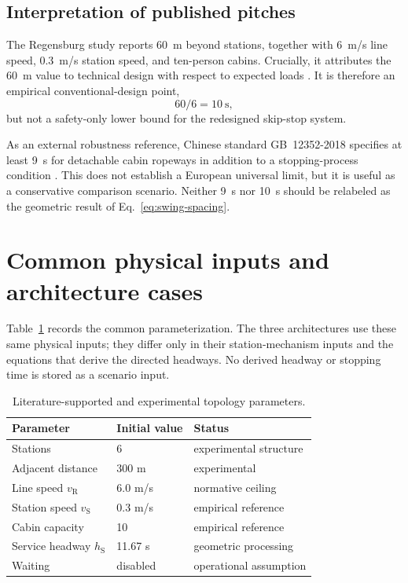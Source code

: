 \documentclass[11pt,a4paper]{scrartcl}
\newcommand{\vlinehaul}{v_{\mathrm R}}
\newcommand{\vstation}{v_{\mathrm S}}
\newcommand{\hservice}{h_{\mathrm S}}
\begin{document}
\subsection{Interpretation of published pitches}

The Regensburg study reports 60~m beyond stations, together with 6~m/s line
speed, 0.3~m/s station speed, and ten-person cabins.  Crucially, it attributes
the 60~m value to technical design with respect to expected loads
\cite{haimerl2022}.  It is therefore an empirical conventional-design point,
\[
60/6=10\ \mathrm s,
\]
but not a safety-only lower bound for the redesigned skip-stop system.

As an external robustness reference, Chinese standard GB~12352-2018 specifies
at least 9~s for detachable cabin ropeways in addition to a stopping-process
condition \cite{gb12352}.  This does not establish a European universal limit,
but it is useful as a conservative comparison scenario.  Neither 9~s nor 10~s
should be relabeled as the geometric result of Eq.~\eqref{eq:swing-spacing}.

\section{Common physical inputs and architecture cases}

Table~\ref{tab:baseline} records the common parameterization.  The three
architectures use these same physical inputs; they differ only in their
station-mechanism inputs and the equations that derive the directed headways.
No derived headway or stopping time is stored as a scenario input.

\begin{table}[ht]
\centering
\caption{Literature-supported and experimental topology parameters.}
\label{tab:baseline}
\begin{tabular}{@{}lll@{}}
\toprule
Parameter & Initial value & Status \\
\midrule
Stations & 6 & experimental structure \\
Adjacent distance & 300 m & experimental \\
Line speed $\vlinehaul$ & 6.0 m/s & normative ceiling \\
Station speed $\vstation$ & 0.3 m/s & empirical reference \\
Cabin capacity & 10 & empirical reference \\
Service headway $\hservice$ & 11.67 s & geometric processing \\
Waiting & disabled & operational assumption \\
\bottomrule
\end{tabular}
\end{table}
\end{document}
